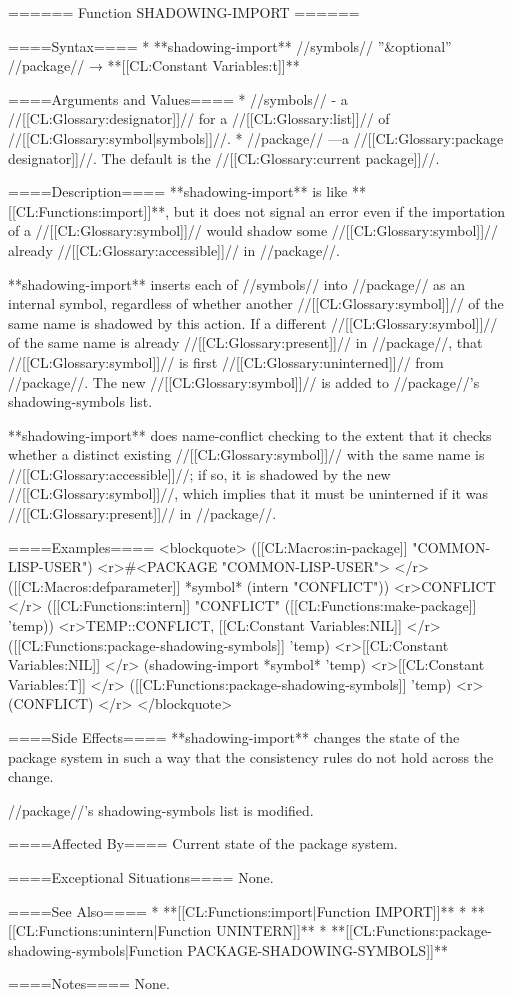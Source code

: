 ====== Function SHADOWING-IMPORT ======

====Syntax====
  * **shadowing-import** //symbols// ''&optional'' //package// → **[[CL:Constant Variables:t]]**

====Arguments and Values====
  * //symbols// - a //[[CL:Glossary:designator]]// for a //[[CL:Glossary:list]]// of //[[CL:Glossary:symbol|symbols]]//.
  * //package// ---a //[[CL:Glossary:package designator]]//. The default is the //[[CL:Glossary:current package]]//.

====Description====
**shadowing-import** is like **[[CL:Functions:import]]**, but it does not signal an error even if the importation of a //[[CL:Glossary:symbol]]// would shadow some //[[CL:Glossary:symbol]]// already //[[CL:Glossary:accessible]]// in //package//.

**shadowing-import** inserts each of //symbols// into //package// as an internal symbol, regardless of whether another //[[CL:Glossary:symbol]]// of the same name is shadowed by this action. If a different //[[CL:Glossary:symbol]]// of the same name is already //[[CL:Glossary:present]]// in //package//, that //[[CL:Glossary:symbol]]// is first //[[CL:Glossary:uninterned]]// from //package//. The new //[[CL:Glossary:symbol]]// is added to //package//'s shadowing-symbols list.

**shadowing-import** does name-conflict checking to the extent that it checks whether a distinct existing //[[CL:Glossary:symbol]]// with the same name is //[[CL:Glossary:accessible]]//; if so, it is shadowed by the new //[[CL:Glossary:symbol]]//, which implies that it must be uninterned if it was //[[CL:Glossary:present]]// in //package//.

====Examples====
<blockquote> 
([[CL:Macros:in-package]] "COMMON-LISP-USER") <r>#<PACKAGE "COMMON-LISP-USER"> </r>
([[CL:Macros:defparameter]] *symbol* (intern "CONFLICT")) <r>CONFLICT </r>
([[CL:Functions:intern]] "CONFLICT" ([[CL:Functions:make-package]] 'temp)) <r>TEMP::CONFLICT, [[CL:Constant Variables:NIL]] </r>
([[CL:Functions:package-shadowing-symbols]] 'temp) <r>[[CL:Constant Variables:NIL]] </r>
(shadowing-import *symbol* 'temp) <r>[[CL:Constant Variables:T]] </r>
([[CL:Functions:package-shadowing-symbols]] 'temp) <r>(CONFLICT) </r>
</blockquote>

====Side Effects====
**shadowing-import** changes the state of the package system in such a way that the consistency rules do not hold across the change.

//package//'s shadowing-symbols list is modified.

====Affected By====
Current state of the package system.

====Exceptional Situations====
None.

====See Also====
  * **[[CL:Functions:import|Function IMPORT]]**
  * **[[CL:Functions:unintern|Function UNINTERN]]**
  * **[[CL:Functions:package-shadowing-symbols|Function PACKAGE-SHADOWING-SYMBOLS]]**

====Notes====
None.

